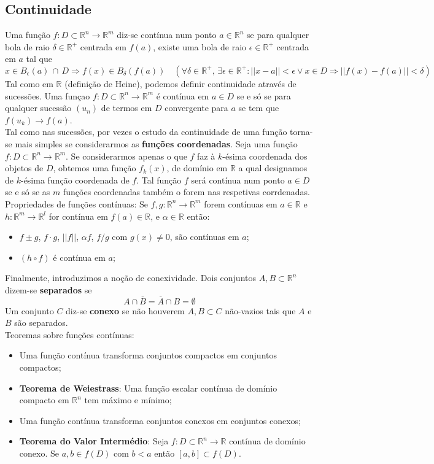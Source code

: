 \documentclass{article}
\newcommand{\R}{\mathbb{R}}
\begin{document}
\subsection{Continuidade}
Uma função $f: D \subset \R^n \to \R^m$ diz-se contínua num ponto $a \in \R^n$ se para qualquer bola de raio $\delta \in \R^+$ centrada em $f(a)$, existe uma bola de raio $\epsilon \in \R^+$ centrada em $a$ tal que 
$$x \in B_\epsilon(a) \, \cap \, D \Rightarrow f(x) \in B_\delta(f(a)) \quad (\forall \delta \in \R^+, \, \exists \epsilon \in \R^+ : ||x-a|| < \epsilon \vee x \in D \Rightarrow ||f(x)-f(a)|| < \delta)$$
Tal como em $\R$ (definição de Heine), podemos definir continuidade através de sucessões. Uma funçao $f : D \subset \R^n \to \R^m$ é contínua em $a \in D$ se e só se para qualquer sucessão $(u_n)$ de termos em $D$ convergente para $a$ se tem que $f(u_k) \to f(a)$.\\
Tal como nas sucessões, por vezes o estudo da continuidade de uma função torna-se mais simples se considerarmos as \textbf{funções coordenadas}. Seja uma função $f: D \subset \R^n \to \R^m$. Se considerarmos apenas o que $f$ faz à $k$-ésima coordenada dos objetos de $D$, obtemos uma função $f_k(x)$, de domínio em $\R$ a qual designamos de $k$-ésima função coordenada de $f$. Tal função $f$ será contínua num ponto $a \in D$ se e só se as $m$ funções coordenadas também o forem nas respetivas corrdenadas.\\
Propriedades de funções contínuas:
Se $f,g: \R^n \to \R^m$ forem contínuas em $a \in \R$ e $h: \R^m \to \R^l$ for contínua em $f(a) \in \R$, e $\alpha \in \R$ então:
\begin{itemize}
	\item $f \pm g$, $f \cdot g$, $||f||$, $\alpha f$, $f/g$ com $g(x) \neq 0$, são contínuas em $a$;
	\item $(h \circ f)$ é contínua em $a$;
\end{itemize}
Finalmente, introduzimos a noção de conexividade. Dois conjuntos $A,B \subset \R^n$ dizem-se \textbf{separados} se 
$$
A \cap \overline{B} = \overline{A} \cap B = \emptyset
$$
Um conjunto $C$ diz-se \textbf{conexo} se não houverem $A,B \subset C$ não-vazios tais que $A$ e $B$ são separados.\\
Teoremas sobre funções contínuas:
\begin{itemize}
	\item Uma função contínua transforma conjuntos compactos em conjuntos compactos;
	\item \textbf{Teorema de Weiestrass}: Uma função escalar contínua de domínio compacto em $\R^n$ tem máximo e mínimo;
	\item Uma função contínua transforma conjuntos conexos em conjuntos conexos;
	\item \textbf{Teorema do Valor Intermédio}: Seja $f : D \subset \R^n \to \R$ contínua de domínio conexo. Se $a,b \in f(D)$ com $b<a$ então $[a,b] \subset f(D)$.
\end{itemize}
\end{document}
